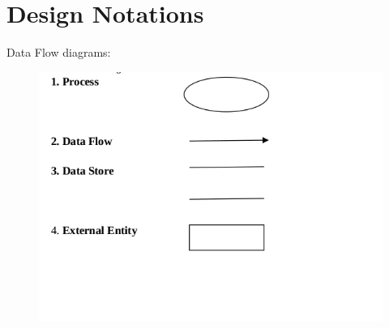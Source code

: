 \section{Design Notations}
\newpage
\noindent Data Flow diagrams:
\begin{figure}[h]
\centering \includegraphics[scale=0.6]{images/sss1.png}
\end{figure}

